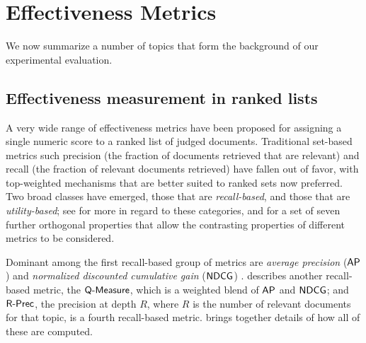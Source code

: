 \section{Effectiveness Metrics}
\label{sec-metrics}

We now summarize a number of topics that form the background of our
experimental evaluation.

\subsection{Effectiveness measurement in ranked lists}

A very wide range of effectiveness metrics have been proposed for
assigning a single numeric score to a ranked list of judged
documents.
Traditional set-based metrics such precision (the fraction of
documents retrieved that are relevant) and recall (the fraction of
relevant documents retrieved) have fallen out of favor, with
top-weighted mechanisms that are better suited to ranked sets now
preferred.
Two broad classes have emerged, those that are {\emph{recall-based}},
and those that are {\emph{utility-based}}; see {\citet{moffat13airs}}
for more in regard to these categories, and for a set of seven
further orthogonal properties that allow the contrasting properties
of different metrics to be considered.

Dominant among the first recall-based group of metrics are
{\emph{average precision}} (${\mbox{\sf{AP}}}$) and {\emph{normalized discounted
cumulative gain}} (${\mbox{\sf{NDCG}}}$) {\citep{jk02acmtois}}.
{\citet{sakai04ntcir}} describes another recall-based metric, the
${\mbox{\sf{Q-Measure}}}$, which is a weighted blend of ${\mbox{\sf{AP}}}$ and ${\mbox{\sf{NDCG}}}$; and
${\mbox{\sf{R-Prec}}}$, the precision at depth $R$, where $R$ is the number of
relevant documents for that topic, is a fourth recall-based metric.
{\citet{moffat13airs}} brings together details of how all of these
are computed.

